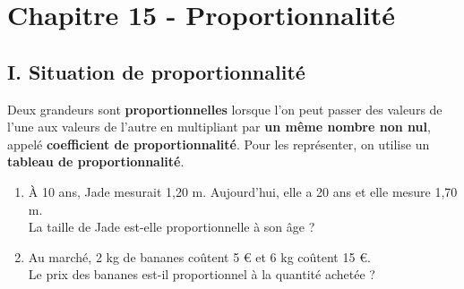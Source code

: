 \section*{Chapitre 15 - Proportionnalité}

\subsection*{I. Situation de proportionnalité}

\begin{Définition}[c]
Deux grandeurs sont \textbf{proportionnelles} lorsque l'on peut passer des valeurs de l'une aux valeurs de l'autre en multipliant par \textbf{un même nombre non nul}, appelé \textbf{coefficient de proportionnalité}. Pour les représenter, on utilise un \textbf{tableau de proportionnalité}.
\end{Définition}

\begin{Exemples}
\begin{enumerate}
\item À 10 ans, Jade mesurait 1,20 m. Aujourd'hui, elle a 20 ans et elle mesure 1,70 m.\\
La taille de Jade est-elle proportionnelle à son âge ? 

\ligne

\ligne

\ligne

\item Au marché, 2 kg de bananes coûtent 5 € et 6 kg coûtent 15 €.\\
Le prix des bananes est-il proportionnel à la quantité achetée ?

\ligne

\ligne

\ligne
\end{enumerate}
\end{Exemples}

